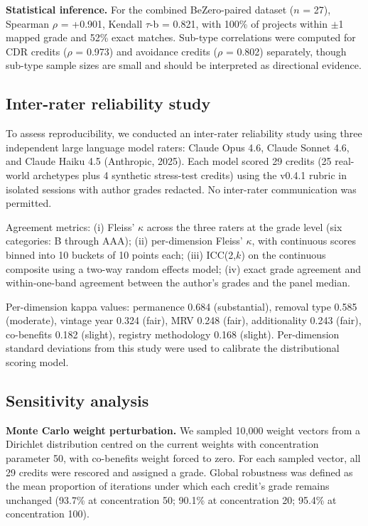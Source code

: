 \documentclass[11pt]{article}
\begin{document}
\textbf{Statistical inference.} For the combined BeZero-paired dataset ($n$ = 27), Spearman $\rho$ = +0.901, Kendall $\tau$-b = 0.821, with 100\% of projects within $\pm$1 mapped grade and 52\% exact matches. Sub-type correlations were computed for CDR credits ($\rho$ = 0.973) and avoidance credits ($\rho$ = 0.802) separately, though sub-type sample sizes are small and should be interpreted as directional evidence.

\subsection*{Inter-rater reliability study}

To assess reproducibility, we conducted an inter-rater reliability study using three independent large language model raters: Claude Opus 4.6, Claude Sonnet 4.6, and Claude Haiku 4.5 (Anthropic, 2025). Each model scored 29 credits (25 real-world archetypes plus 4 synthetic stress-test credits) using the v0.4.1 rubric in isolated sessions with author grades redacted. No inter-rater communication was permitted.

Agreement metrics: (i) Fleiss' $\kappa$ across the three raters at the grade level (six categories: B through AAA); (ii) per-dimension Fleiss' $\kappa$, with continuous scores binned into 10 buckets of 10 points each; (iii) ICC(2,$k$) on the continuous composite using a two-way random effects model; (iv) exact grade agreement and within-one-band agreement between the author's grades and the panel median.

Per-dimension kappa values: permanence 0.684 (substantial), removal type 0.585 (moderate), vintage year 0.324 (fair), MRV 0.248 (fair), additionality 0.243 (fair), co-benefits 0.182 (slight), registry methodology 0.168 (slight). Per-dimension standard deviations from this study were used to calibrate the distributional scoring model.

\subsection*{Sensitivity analysis}

\textbf{Monte Carlo weight perturbation.} We sampled 10,000 weight vectors from a Dirichlet distribution centred on the current weights with concentration parameter 50, with co-benefits weight forced to zero. For each sampled vector, all 29 credits were rescored and assigned a grade. Global robustness was defined as the mean proportion of iterations under which each credit's grade remains unchanged (93.7\% at concentration 50; 90.1\% at concentration 20; 95.4\% at concentration 100).
\end{document}
